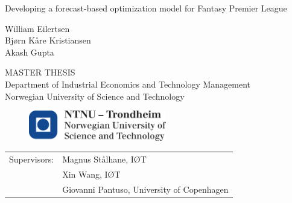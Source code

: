 \vspace*{7cm}


\begin{center}{\vspace{-7cm}}
{\Huge Developing a forecast-based optimization model for Fantasy Premier League}
\end{center}
\vspace*{7cm}

\begin{center}{\vspace{-4cm}}
{\Large William Eilertsen} \\
{\Large Bj\o rn K\aa re Kristiansen} \\ 
{\Large Akash Gupta} \\
\end{center}

\begin{center}{\vspace{2cm}}
   MASTER THESIS \\ 
   Department of Industrial Economics and Technology Management\\
Norwegian University of Science and Technology
\end{center}

\begin{figure}[H]{\vspace{0.5cm}}
    \centering
    \includegraphics[width = 60mm,scale=0.5]{fig/ntnu_logo.png}
\end{figure}


\begin{table}[b]
    \begin{tabular}{ll}
       Supervisors:  & Magnus St\aa lhane, I\O T \\ 
                     & Xin Wang, I\O T \\
                     & Giovanni Pantuso, University of Copenhagen \\ 
    \end{tabular}
\end{table}

\cleardoublepage